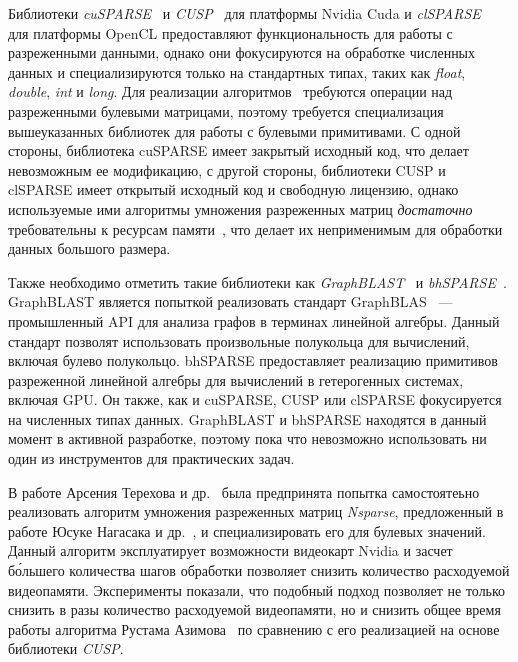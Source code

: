 Библиотеки \textit{cuSPARSE}~\cite{net:cusparse_docs} и \textit{CUSP}~\cite{net:cusplibrary} для платформы Nvidia Cuda и \textit{clSPARSE}~\cite{10.1145/2909437.2909442} для платформы OpenCL предоставляют функциональность для работы с разреженными данными, однако они фокусируются на обработке численных данных и специализируются только на стандартных типах, таких как \textit{float}, \textit{double}, \textit{int} и \textit{long}. Для реализации алгоритмов~\cite{inbook:kronecker_cfpq_adbis, inproceedings:matrix_cfpq} требуются операции над разреженными булевыми матрицами, поэтому требуется специализация вышеуказанных библиотек для работы с булевыми примитивами. С одной стороны, библиотека cuSPARSE имеет закрытый исходный код, что делает невозможным ее модификацию, с другой стороны, библиотеки CUSP и clSPARSE имеет открытый исходный код и свободную лицензию, однако используемые ими алгоритмы умножения разреженных матриц \textit{достаточно} требовательны к ресурсам памяти~\cite{inproceedings:cfqp_matrix_with_single_source}, что делает их неприменимым для обработки данных большого размера.

Также необходимо отметить такие библиотеки как \textit{GraphBLAST}~\cite{yang2019graphblast} и \textit{bhSPARSE}~\cite{10.1016/j.jpdc.2015.06.010}. GraphBLAST является попыткой реализовать стандарт GraphBLAS~\cite{paper:graphblas_foundations} --- промышленный API для анализа графов в терминах линейной алгебры. Данный стандарт позволят использовать произвольные полукольца для вычислений, включая булево полукольцо. bhSPARSE предоставляет реализацию примитивов разреженной линейной алгебры для вычислений в гетерогенных системах, включая GPU. Он также, как и cuSPARSE, CUSP или clSPARSE фокусируется на численных типах данных. GraphBLAST и bhSPARSE находятся в данный момент в активной разработке, поэтому пока что невозможно использовать ни один из инструментов для практических задач.

В работе Арсения Терехова и др.~\cite{inproceedings:cfqp_matrix_with_single_source} была предпринята попытка самостоятеьно реализовать алгоритм умножения разреженных матриц \textit{Nsparse}, предложенный в работе Юсуке Нагасака и др.~\cite{inproceedings:spgemm_mem_saving_for_nvidia}, и специализировать его для булевых значений. Данный алгоритм эксплуатирует возможности видеокарт Nvidia и засчет б\'ольшего количества шагов обработки позволяет снизить количество расходуемой видеопамяти. Эксперименты показали, что подобный подход позволяет не только снизить в разы количество расходуемой видеопамяти, но и снизить общее время работы алгоритма Рустама Азимова~\cite{inproceedings:matrix_cfpq} по сравнению с его реализацией на основе библиотеки \textit{CUSP}. 

